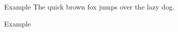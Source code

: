 \begin{block}{Example}
\small\alert{The quick brown fox jumps over the lazy dog.}
\blindtext
\end{block}

\vspace{1ex}

\begin{block}{Example}
\small\blinditemize
\end{block}

